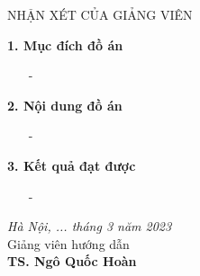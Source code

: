 \newpage
\thispagestyle{empty}
\begin{center}
    NHẬN XÉT CỦA GIẢNG VIÊN
\end{center}
\vspace{1cm}
\textbf{1. Mục đích đồ án}
\begin{itemize}
    \item[-] 
\end{itemize}
\vspace{3cm}

\noindent\textbf{2. Nội dung đồ án}
\begin{itemize}
    \item[-] 
\end{itemize}
\vspace{3cm} 

\noindent\textbf{3. Kết quả đạt được}
\begin{itemize}
    \item[-] 
\end{itemize}
\vspace{3cm}

\vspace{.5cm}
\hspace{0.5\textwidth}
\begin{minipage}{0.5\textwidth}
	\noindent\begin{center}
		\textit{Hà Nội, ... tháng 3 năm 2023} \\
		Giảng viên hướng dẫn\\ \vspace{2cm}
		\textbf{TS. Ngô Quốc Hoàn} \\
	\end{center}	
\end{minipage}
